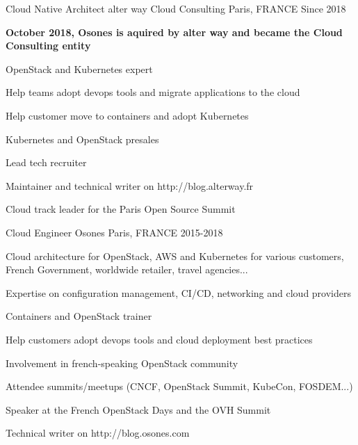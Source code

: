 

\begin{cventries}

  \cventry
    {Cloud Native Architect} %
    {alter way Cloud Consulting} %
    {Paris, FRANCE} %
    {Since 2018} %
    {
      \begin{cvitems} %
      \item {\textbf{October 2018, Osones is aquired by alter way and became the Cloud
        Consulting entity}}
      \item {OpenStack and Kubernetes expert}
      \item {Help teams adopt devops tools and migrate applications to the
        cloud}
      \item {Help customer move to containers and adopt Kubernetes}
      \item {Kubernetes and OpenStack presales}
      \item {Lead tech recruiter}
      \item {Maintainer and technical writer on http://blog.alterway.fr}
      \item {Cloud track leader for the Paris Open Source Summit}
      \end{cvitems}
    }

  \cventry
    {Cloud Engineer} %
    {Osones} %
    {Paris, FRANCE} %
    {2015-2018} %
    {
      \begin{cvitems} %
      \item {Cloud architecture for OpenStack, AWS and Kubernetes for various
       customers, French Government, worldwide retailer, travel agencies...}
      \item {Expertise on configuration management, CI/CD, networking and cloud
       providers}
      \item {Containers and OpenStack trainer}
      \item {Help customers adopt devops tools and cloud deployment best
       practices}
      \item {Involvement in french-speaking OpenStack community}
      \item {Attendee summits/meetups (CNCF, OpenStack Summit, KubeCon, FOSDEM...)}
      \item {Speaker at the French OpenStack Days and the OVH Summit}
      \item {Technical writer on http://blog.osones.com}
      \end{cvitems}
    }


\end{cventries}
